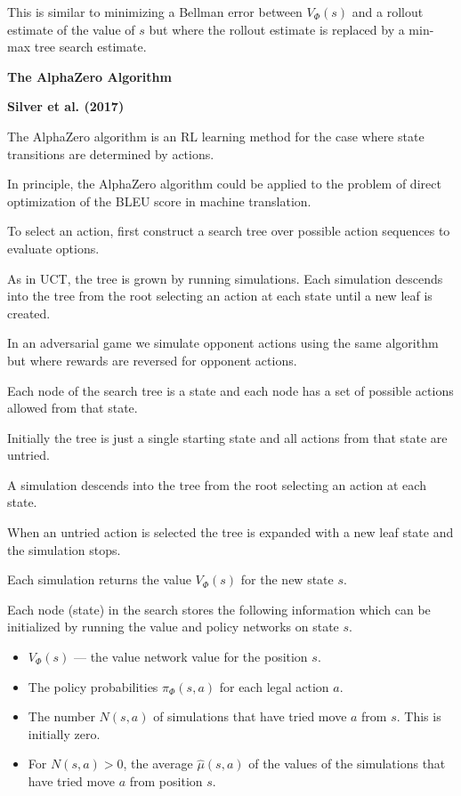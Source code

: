 {\vfill
This is similar to minimizing a Bellman error between $V_\Phi(s)$ and a rollout estimate of the value of $s$ but where the rollout
estimate is replaced by a min-max tree search estimate.

\slide{}

\centerline{\bf The AlphaZero Algorithm}
\bigskip
\centerline{\bf Silver et al. (2017)}

\vfill


The AlphaZero algorithm is an RL learning method for the case where state transitions are determined by actions.

\vfill
In principle, the AlphaZero algorithm could be applied to the problem of direct optimization of the BLEU score in machine translation.


To select an action, first construct a search tree over possible action sequences to evaluate options.

\vfill
As in UCT, the tree is grown by running simulations.  Each simulation descends into the tree from the root selecting an action at each state until a new leaf is created.

\vfill
In an adversarial game we simulate opponent actions using the same algorithm but where rewards are reversed for opponent actions.


Each node of the search tree is a state and each node has a set of possible actions allowed from that state.

\vfill
Initially the tree is just a single starting state and all actions from that state are untried.

\vfill
A simulation descends into the tree from the root selecting an action at each state.

\vfill
When an untried action is selected the tree is expanded with a new leaf state and the simulation stops.

\vfill
Each simulation returns the value $V_\Phi(s)$ for the new state $s$.


\vfill
Each node (state) in the search stores the following information which can be initialized
by running the value and policy networks on state $s$.

\begin{itemize}
\item $V_\Phi(s)$ --- the value network value for the position $s$.
\item The policy probabilities $\pi_\Phi(s,a)$ for each legal action $a$.
\item The number $N(s,a)$ of simulations that have tried move $a$ from $s$. This is initially zero.
\item For $N(s,a) > 0$, the average $\hat{\mu}(s,a)$ of the values of the simulations that have
  tried move $a$ from position $s$.
\end{itemize}

}
